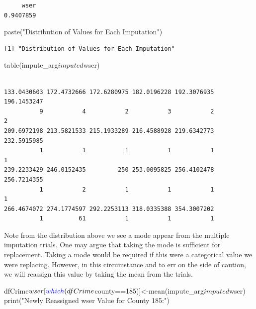 \documentclass[]{article}
\newenvironment{Shaded}{}{}
\newcommand{\DecValTok}[1]{#1}
\newcommand{\KeywordTok}[1]{\textcolor[rgb]{0.00,0.00,1.00}{#1}}
\newcommand{\NormalTok}[1]{#1}
\newcommand{\OperatorTok}[1]{#1}
\newcommand{\StringTok}[1]{\textcolor[rgb]{0.00,0.50,0.50}{#1}}
\begin{document}
\begin{verbatim}
     wser 
0.9407859 
\end{verbatim}

\begin{Shaded}
\begin{Highlighting}[]
\KeywordTok{paste}\NormalTok{(}\StringTok{"Distribution of Values for Each Imputation"}\NormalTok{)}
\end{Highlighting}
\end{Shaded}

\begin{verbatim}
[1] "Distribution of Values for Each Imputation"
\end{verbatim}

\begin{Shaded}
\begin{Highlighting}[]
\KeywordTok{table}\NormalTok{(impute_arg}\OperatorTok{$}\NormalTok{imputed}\OperatorTok{$}\NormalTok{wser)}
\end{Highlighting}
\end{Shaded}

\begin{verbatim}

133.0430603 172.4732666 172.6280975 182.0196228 192.3076935 196.1453247 
          9           4           2           3           2           2 
209.6972198 213.5821533 215.1933289 216.4588928 219.6342773 232.5915985 
          1           1           1           1           1           1 
239.2233429 246.0152435         250 253.0095825 256.4102478 256.7214355 
          1           2           1           1           1           1 
266.4674072 274.1774597 292.2253113 318.0335388 354.3007202 
          1          61           1           1           1 
\end{verbatim}

Note from the distribution above we see a mode appear from the multiple
imputation trials. One may argue that taking the mode is sufficient for
replacement. Taking a mode would be required if this were a categorical
value we were replacing. However, in this circumstance and to err on the
side of caution, we will reassign this value by taking the mean from the
trials.

\begin{Shaded}
\begin{Highlighting}[]
\NormalTok{dfCrime}\OperatorTok{$}\NormalTok{wser[}\KeywordTok{which}\NormalTok{(dfCrime}\OperatorTok{$}\NormalTok{county}\OperatorTok{==}\DecValTok{185}\NormalTok{)]<-}\KeywordTok{mean}\NormalTok{(impute_arg}\OperatorTok{$}\NormalTok{imputed}\OperatorTok{$}\NormalTok{wser)}
\KeywordTok{print}\NormalTok{(}\StringTok{"Newly Reassigned wser Value for County 185:"}\NormalTok{)}
\end{Highlighting}
\end{Shaded}
\end{document}
